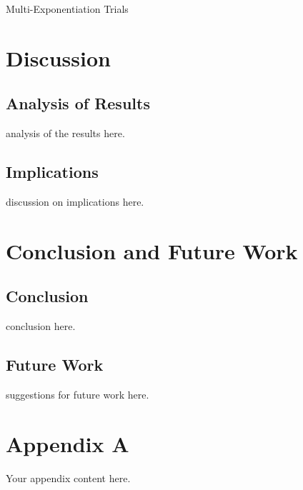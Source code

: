 \documentclass[12pt,a4paper]{report}
\begin{document}
\begin{table}
	\caption{Multi-Exponentiation Trials}
	\label{table:mexp}
\end{table}

\chapter{Discussion}
\section{Analysis of Results}
analysis of the results here.

\section{Implications}
discussion on implications here.

\chapter{Conclusion and Future Work}
\section{Conclusion}
conclusion here.

\section{Future Work}
suggestions for future work here.

\newpage
{}



\appendix
\chapter{Appendix A}
Your appendix content here.
\end{document}
